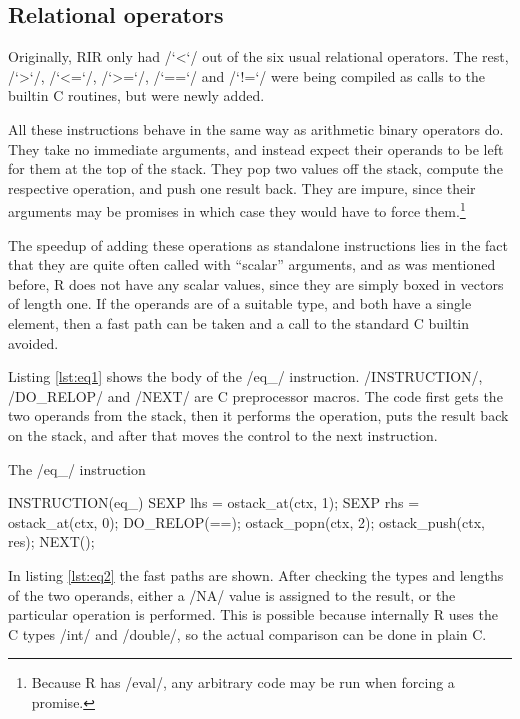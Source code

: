 
\subsection{Relational operators}

Originally, RIR only had \rinline/`<`/ out of the six usual relational operators. The rest, \rinline/`>`/, \rinline/`<=`/, \rinline/`>=`/, \rinline/`==`/ and \rinline/`!=`/ were being compiled as calls to the builtin C routines, but were newly added.

All these instructions behave in the same way as arithmetic binary operators do. They take no immediate arguments, and instead expect their operands to be left for them at the top of the stack. They pop two values off the stack, compute the respective operation, and push one result back. They are impure, since their arguments may be promises in which case they would have to force them.\footnote{Because R has \rinline/eval/, any arbitrary code may be run when forcing a promise.}

The speedup of adding these operations as standalone instructions lies in the fact that they are quite often called with ``scalar'' arguments, and as was mentioned before, R does not have any scalar values, since they are simply boxed in vectors of length one. If the operands are of a suitable type, and both have a single element, then a fast path can be taken and a call to the standard C builtin avoided.

Listing \ref{lst:eq1} shows the body of the \cinline/eq_/ instruction. \cinline/INSTRUCTION/, \cinline/DO_RELOP/ and \cinline/NEXT/ are C preprocessor macros. The code first gets the two operands from the stack, then it performs the operation, puts the result back on the stack, and after that moves the control to the next instruction.

\begin{listing}[htbp]
  \caption{\label{lst:eq1}The \cinline/eq_/ instruction}
  \begin{ccode}
INSTRUCTION(eq_) {
    SEXP lhs = ostack_at(ctx, 1);
    SEXP rhs = ostack_at(ctx, 0);
    DO_RELOP(==);
    ostack_popn(ctx, 2);
    ostack_push(ctx, res);
    NEXT();
}
  \end{ccode}
\end{listing}

In listing \ref{lst:eq2} the fast paths are shown. After checking the types and lengths of the two operands, either a \rinline/NA/ value is assigned to the result, or the particular operation is performed. This is possible because internally R uses the C types \cinline/int/ and \cinline/double/, so the actual comparison can be done in plain C.

